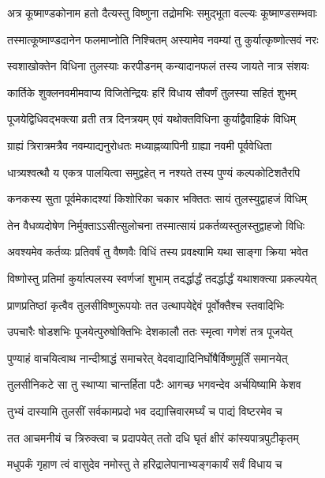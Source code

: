\twolineshloka
{अत्र कूष्माण्डकोनाम हतो दैत्यस्तु विष्णुना}
{तद्रोमभिः समुद्भूता वल्ल्यः कूष्माण्डसम्भवाः} %

\twolineshloka
{तस्मात्कूष्माण्डदानेन फलमाप्नोति निश्चितम्}
{अस्यामेव नवम्यां तु कुर्यात्कृष्णोत्सवं नरः} %

\twolineshloka
{स्वशाखोक्तेन विधिना तुलस्याः करपीडनम्}
{कन्यादानफलं तस्य जायते नात्र संशयः} %

\twolineshloka
{कार्तिके शुक्लनवमीमवाप्य विजितेन्द्रियः}
{हरिं विधाय सौवर्णं तुलस्या सहितं शुभम्} %

\twolineshloka
{पूजयेद्विधिवद्भक्त्या व्रती तत्र दिनत्रयम्}
{एवं यथोक्तविधिना कुर्याद्वैवाहिकं विधिम्} %

\twolineshloka
{ग्राह्यं त्रिरात्रमत्रैव नवम्याद्यनुरोधतः}
{मध्याह्नव्यापिनी ग्राह्या नवमी पूर्ववेधिता} %

\twolineshloka
{धात्र्यश्वत्थौ य एकत्र पालयित्वा समुद्वहेत्}
{न नश्यते तस्य पुण्यं कल्पकोटिशतैरपि} %

\twolineshloka
{कनकस्य सुता पूर्वमेकादश्यां किशोरिका}
{चकार भक्तितः सायं तुलस्युद्वाहजं विधिम्} %

\twolineshloka
{तेन वैधव्यदोषेण निर्मुक्ताऽऽसीत्सुलोचना}
{तस्मात्सायं प्रकर्तव्यस्तुलस्तुद्वाहजो विधिः} %

\twolineshloka
{अवश्यमेव कर्तव्यः प्रतिवर्षं तु वैष्णवैः}
{विधिं तस्य प्रवक्ष्यामि यथा साङ्गा क्रिया भवेत} %

\twolineshloka
{विष्णोस्तु प्रतिमां कुर्यात्पलस्य स्वर्णजां शुभाम्}
{तदर्द्धार्द्धं तदर्द्धार्द्धं यथाशक्त्या प्रकल्पयेत्} %

\twolineshloka
{प्राणप्रतिष्ठां कृत्वैव तुलसीविष्णुरूपयोः}
{तत उत्थापयेद्देवं पूर्वोक्तैश्च स्तवादिभिः} %

\twolineshloka
{उपचारैः षोडशभिः पूजयेत्पुरुषोक्तिभिः}
{देशकालौ ततः स्मृत्वा गणेशं तत्र पूजयेत्} %

\twolineshloka
{पुण्याहं वाचयित्वाथ नान्दीश्राद्धं समाचरेत्}
{वेदवाद्यादिनिर्घोषैर्विष्णुमूर्तिं समानयेत्} %

\twolineshloka
{तुलसीनिकटे सा तु स्थाप्या चान्तर्हिता पटैः}
{आगच्छ भगवन्देव अर्चयिष्यामि केशव} %

\twolineshloka
{तुभ्यं दास्यामि तुलसीं सर्वकामप्रदो भव}
{दद्यात्त्रिवारमर्घ्यं च पाद्यं विष्टरमेव च} %

\twolineshloka
{तत आचमनीयं च त्रिरुक्त्वा च प्रदापयेत्}
{ततो दधि घृतं क्षीरं कांस्यपात्रपुटीकृतम्} %

\twolineshloka
{मधुपर्कं गृहाण त्वं वासुदेव नमोस्तु ते}
{हरिद्रालेपानाभ्यङ्गकार्यं सर्वं विधाय च} %

